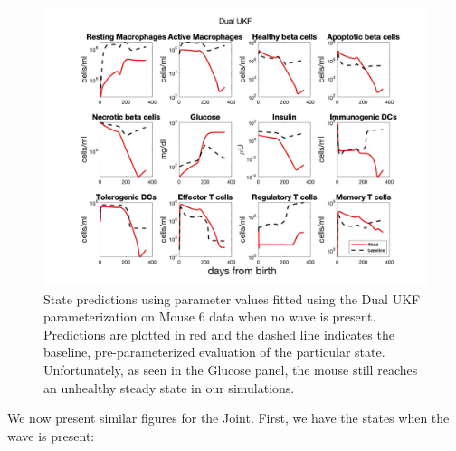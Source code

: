 \begin{appendices}
\begin{figure}[H] 
    \centering
    \includegraphics[width=15cm]{Kalman_Filter_Images/States_NOWAVE_ALL_withBaseline.jpg}
    \caption{State predictions using parameter values fitted using the Dual UKF parameterization on Mouse 6 data when no wave is present. Predictions are plotted in red and the dashed line indicates the baseline, pre-parameterized evaluation of the particular state. Unfortunately, as seen in the Glucose panel, the mouse still reaches an unhealthy steady state in our simulations.}
    \label{fig:Dual_ALLSTATES_NoWave}
\end{figure}


We now present similar figures for the Joint. First, we have the states when the wave is present:


\end{appendices}

